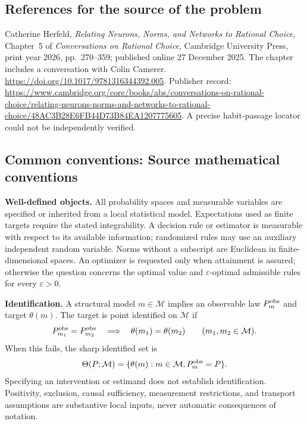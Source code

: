 \documentclass[11pt,a4paper]{article}
\begin{document}
\subsection*{References for the source of the problem}
Catherine Herfeld, \emph{Relating Neurons, Norms, and Networks to Rational Choice}, Chapter~5 of \emph{Conversations on Rational Choice}, Cambridge University Press, print year 2026, pp.~270--359; published online 27 December 2025. The chapter includes a conversation with Colin Camerer. \url{https://doi.org/10.1017/9781316344392.005}. Publisher record: \url{https://www.cambridge.org/core/books/abs/conversations-on-rational-choice/relating-neurons-norms-and-networks-to-rational-choice/48AC3B28E6FB44D73B84EA1207775605}. A precise habit-passage locator could not be independently verified.

\subsection*{Common conventions: Source mathematical conventions}

\textbf{Well-defined objects.}
All probability spaces and measurable variables are specified or inherited
from a local statistical model. Expectations used as finite targets require
the stated integrability. A decision rule or estimator is measurable with
respect to its available information; randomized rules may use an auxiliary
independent random variable. Norms without a subscript are Euclidean in
finite-dimensional spaces. An optimizer is requested only when attainment
is assured; otherwise the question concerns the optimal value and
$\varepsilon$-optimal admissible rules for every $\varepsilon>0$.

\textbf{Identification.}
A structural model $m\in\mathcal M$ implies an observable law
$P_m^{\rm obs}$ and target $\theta(m)$. The target is point identified on
$\mathcal M$ if
\[
 P_{m_1}^{\rm obs}=P_{m_2}^{\rm obs}
 \quad\Longrightarrow\quad\theta(m_1)=\theta(m_2)
 \qquad(m_1,m_2\in\mathcal M).
\]
When this fails, the sharp identified set is
\[
 \Theta(P;\mathcal M)=\{\theta(m):m\in\mathcal M,
                                  P_m^{\rm obs}=P\}.
\]
Specifying an intervention or estimand does not establish identification.
Positivity, exclusion, causal sufficiency, measurement restrictions, and
transport assumptions are substantive local inputs, never automatic
consequences of notation.
\end{document}
